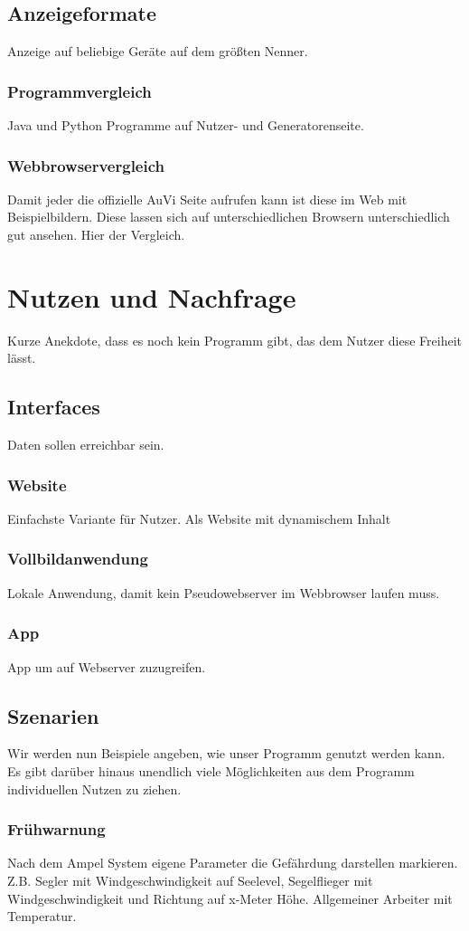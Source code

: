 \documentclass[a4paper,oneside,10pt,titlepage]{article}
\begin{document}
\subsection{Anzeigeformate}
Anzeige auf beliebige Geräte auf dem größten Nenner.
\subsubsection{Programmvergleich}
Java und Python Programme auf Nutzer- und Generatorenseite.
\subsubsection{Webbrowservergleich}
Damit jeder die offizielle AuVi Seite aufrufen kann ist diese im Web mit Beispielbildern. Diese lassen sich auf unterschiedlichen Browsern unterschiedlich gut ansehen. Hier der Vergleich.
\section{Nutzen und Nachfrage}
Kurze Anekdote, dass es noch kein Programm gibt, das dem Nutzer diese Freiheit lässt.
\subsection{Interfaces}
Daten sollen erreichbar sein.
\subsubsection{Website}
Einfachste Variante für Nutzer. Als Website mit dynamischem Inhalt
\subsubsection{Vollbildanwendung}
Lokale Anwendung, damit kein Pseudowebserver im Webbrowser laufen muss.
\subsubsection{App}
App um auf Webserver zuzugreifen.
\subsection{Szenarien}
Wir werden nun Beispiele angeben, wie unser Programm genutzt werden kann. Es gibt darüber hinaus unendlich viele Möglichkeiten aus dem Programm individuellen Nutzen zu ziehen.
\subsubsection{Frühwarnung}
Nach dem Ampel System eigene Parameter die Gefährdung darstellen markieren. Z.B. Segler mit Windgeschwindigkeit auf Seelevel, Segelflieger mit Windgeschwindigkeit und Richtung auf x-Meter Höhe. Allgemeiner Arbeiter mit Temperatur.
\end{document}
